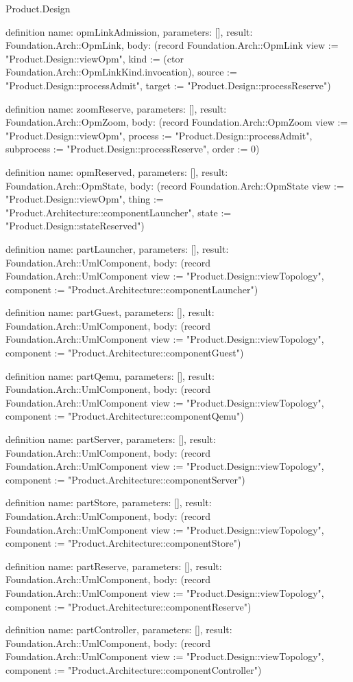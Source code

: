 \begin{lexlean}{Product.Design}
\begin{semanticmodule}
definition{
  name: opmLinkAdmission, parameters: [], result: Foundation.Arch::OpmLink,
  body: (record Foundation.Arch::OpmLink {view := "Product.Design::viewOpm", kind := (ctor Foundation.Arch::OpmLinkKind.invocation), source := "Product.Design::processAdmit", target := "Product.Design::processReserve"})
}

definition{
  name: zoomReserve, parameters: [], result: Foundation.Arch::OpmZoom,
  body: (record Foundation.Arch::OpmZoom {view := "Product.Design::viewOpm", process := "Product.Design::processAdmit", subprocess := "Product.Design::processReserve", order := 0})
}

definition{
  name: opmReserved, parameters: [], result: Foundation.Arch::OpmState,
  body: (record Foundation.Arch::OpmState {view := "Product.Design::viewOpm", thing := "Product.Architecture::componentLauncher", state := "Product.Design::stateReserved"})
}

definition{
  name: partLauncher, parameters: [], result: Foundation.Arch::UmlComponent,
  body: (record Foundation.Arch::UmlComponent {view := "Product.Design::viewTopology", component := "Product.Architecture::componentLauncher"})
}

definition{
  name: partGuest, parameters: [], result: Foundation.Arch::UmlComponent,
  body: (record Foundation.Arch::UmlComponent {view := "Product.Design::viewTopology", component := "Product.Architecture::componentGuest"})
}

definition{
  name: partQemu, parameters: [], result: Foundation.Arch::UmlComponent,
  body: (record Foundation.Arch::UmlComponent {view := "Product.Design::viewTopology", component := "Product.Architecture::componentQemu"})
}

definition{
  name: partServer, parameters: [], result: Foundation.Arch::UmlComponent,
  body: (record Foundation.Arch::UmlComponent {view := "Product.Design::viewTopology", component := "Product.Architecture::componentServer"})
}

definition{
  name: partStore, parameters: [], result: Foundation.Arch::UmlComponent,
  body: (record Foundation.Arch::UmlComponent {view := "Product.Design::viewTopology", component := "Product.Architecture::componentStore"})
}

definition{
  name: partReserve, parameters: [], result: Foundation.Arch::UmlComponent,
  body: (record Foundation.Arch::UmlComponent {view := "Product.Design::viewTopology", component := "Product.Architecture::componentReserve"})
}

definition{
  name: partController, parameters: [], result: Foundation.Arch::UmlComponent,
  body: (record Foundation.Arch::UmlComponent {view := "Product.Design::viewTopology", component := "Product.Architecture::componentController"})
}


\end{semanticmodule}
\end{lexlean}
